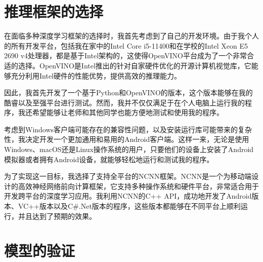 \section{推理框架的选择}

在面临多种深度学习框架的选择时，我首先考虑到了自己的开发环境。由于我个人的所有开发平台，包括我在家中的Intel Core i5-11400和在学校的Intel Xeon E5 2690 v4处理器，都是基于Intel架构的，这使得OpenVINO平台成为了一个非常合适的选择。OpenVINO是Intel推出的针对自家硬件优化的开源计算机视觉库，它能够充分利用Intel硬件的性能优势，提供高效的推理能力。

因此，我首先开发了一个基于Python和OpenVINO的版本，这个版本能够在我的酷睿以及至强平台进行测试。然而，我并不仅仅满足于在个人电脑上运行我的程序，我还希望能够让老师和其他同学也能方便地测试和使用我的程序。

考虑到Windows客户端可能存在的兼容性问题，以及安装运行库可能带来的复杂性，我决定开发一个更加通用和易用的Android客户端。这样一来，无论是使用Windows、macOS还是Linux操作系统的用户，只要他们的设备上安装了Android模拟器或者拥有Android设备，就能够轻松地运行和测试我的程序。

为了实现这一目标，我选择了支持全平台的NCNN框架。NCNN是一个为移动端设计的高效神经网络前向计算框架，它支持多种操作系统和硬件平台，非常适合用于开发跨平台的深度学习应用。我利用NCNN的C++ API，成功地开发了Android版本、VC++版本以及C\#.Net版本的程序，这些版本都能够在不同平台上顺利运行，并且达到了预期的效果。

\section{模型的验证}

